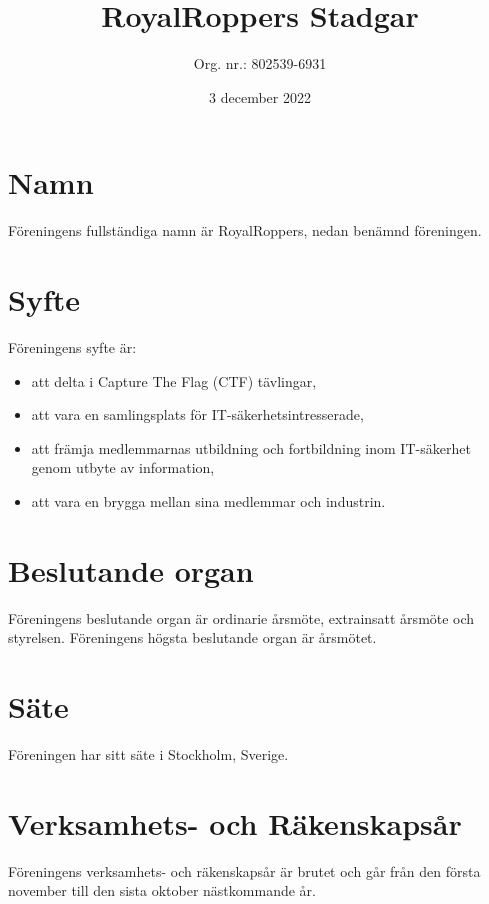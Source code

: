 \documentclass[a4paper,11pt]{article}
\title{RoyalRoppers Stadgar}
\author{Org. nr.: 802539-6931}
\date{3 december 2022}
\begin{document}
\maketitle
\newpage

\tableofcontents
\newpage

\section{Namn}
Föreningens fullständiga namn är RoyalRoppers, nedan benämnd föreningen.

\section{Syfte}
Föreningens syfte är:

\begin{itemize}
    \item att delta i Capture The Flag (CTF) tävlingar,
    \item att vara en samlingsplats för IT-säkerhetsintresserade,
    \item att främja medlemmarnas utbildning och fortbildning inom IT-säkerhet genom utbyte av information,
    \item att vara en brygga mellan sina medlemmar och industrin.
\end{itemize}

\section{Beslutande organ}
Föreningens beslutande organ är ordinarie årsmöte, extrainsatt årsmöte och styrelsen.
Föreningens högsta beslutande organ är årsmötet.

\section{Säte}
Föreningen har sitt säte i Stockholm, Sverige.

\section{Verksamhets- och Räkenskapsår}
Föreningens verksamhets- och räkenskapsår är brutet och går från den första november till den sista oktober nästkommande år.
\end{document}
